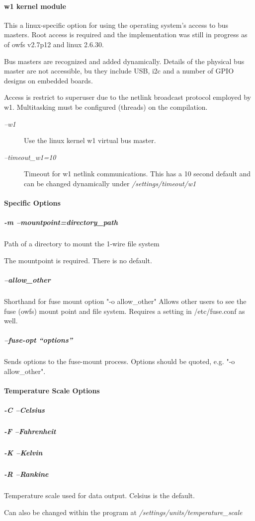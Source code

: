 \paragraph*{ w1 kernel module}
This a linux-specific
option for using the operating system's access to bus masters. Root access
is required and the implementation was still in progress as of owfs v2.7p12
and linux 2.6.30. 

Bus masters are recognized and added dynamically. Details
of the physical bus master are not accessible, bu they include USB, i2c
and a number of GPIO designs on embedded boards. 

Access is restrict to superuser
due to the netlink broadcast protocol employed by w1. Multitasking must
be configured (threads) on the compilation. \begin{description}
\item [\textit{--w1} ] Use the linux kernel w1 virtual
bus master. 
\item [\textit{--timeout\_w1=10} ] Timeout for w1 netlink communications. This has
a 10 second default and can be changed dynamically under \textit{/settings/timeout/w1}
 
\end{description}

\paragraph*{Specific Options}

\subparagraph*{-m --mountpoint=directory\_path}Path of a directory to mount
the 1-wire file system 

The mountpoint is required. There is no default. 
\subparagraph*{--allow\_other}Shorthand
for fuse mount option "-o allow\_other"  Allows other users to see the fuse
(owfs) mount point and file system. Requires a setting in /etc/fuse.conf
as well. 
\subparagraph*{--fuse-opt ``options''}Sends options to the fuse-mount process. Options
should be quoted, e.g. "-o allow\_other".
\paragraph*{Temperature Scale Options}

\subparagraph*{-C --Celsius}
\subparagraph*{-F --Fahrenheit}
\subparagraph*{-K
--Kelvin}
\subparagraph*{-R --Rankine}Temperature scale used for data output. Celsius is the default.


Can also be changed within the program at \textit{/settings/units/temperature\_scale}
           
